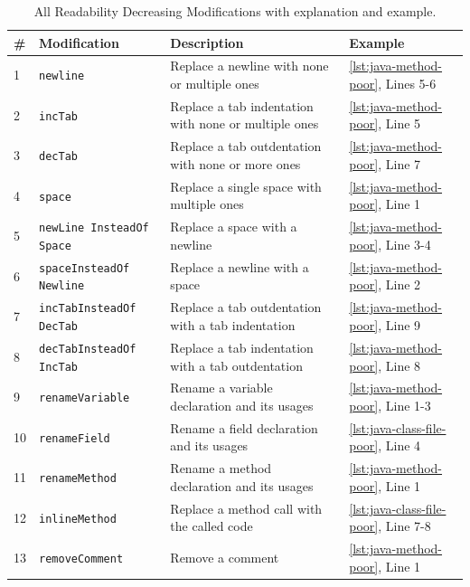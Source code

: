 \documentclass[%
class=scrreprt,
chapterprefix=false,%
open=right,%
twoside=true,%
paper=a4,%
logofile={Logo\_zentral\_farbig\_EN.png},%
thesistype=master,%
UKenglish,%
]{se2thesis}
\theoremstyle{definition}
\newcommand{\RDMs}{Readability Decreasing Modifications\xspace}
\begin{document}
		\begin{table}[p]
		\centering
		\caption{All \RDMs with explanation and example.}
		\label{tab:rdh-description}
		\begin{tabular}{|p{}|p{}|p{}|p{}|}
			\hline
			\textbf{\#} & \textbf{Modification} & \textbf{Description} & \textbf{Example} \\
			\hline
			1 & \texttt{newline} & Replace a newline with none or multiple ones & \autoref{lst:java-method-poor}, Lines 5-6 \\
			\hline
			2 & \texttt{incTab} & Replace a tab indentation with none or multiple ones & \autoref{lst:java-method-poor}, Line 5 \\
			\hline
			3 & \texttt{decTab} & Replace a tab outdentation with none or more ones & \autoref{lst:java-method-poor}, Line 7 \\
			\hline
			4 & \texttt{space} & Replace a single space with multiple ones & \autoref{lst:java-method-poor}, Line 1 \\
			\hline
			5 & \texttt{newLine InsteadOf Space} & Replace a space with a newline & \autoref{lst:java-method-poor}, Line 3-4 \\
			\hline
			6 & \texttt{spaceInsteadOf Newline} & Replace a newline with a space & \autoref{lst:java-method-poor}, Line 2 \\
			\hline
			7 & \texttt{incTabInsteadOf DecTab} & Replace a tab outdentation with a tab indentation & \autoref{lst:java-method-poor}, Line 9 \\
			\hline
			8 & \texttt{decTabInsteadOf IncTab} & Replace a tab indentation with a tab outdentation & \autoref{lst:java-method-poor}, Line 8 \\
			\hline
			9 & \texttt{renameVariable} & Rename a variable declaration and its usages & \autoref{lst:java-method-poor}, Line 1-3 \\
			\hline
			10 & \texttt{renameField} & Rename a field declaration and its usages & \autoref{lst:java-class-file-poor}, Line 4 \\
			\hline
			11 & \texttt{renameMethod} & Rename a method declaration and its usages & \autoref{lst:java-method-poor}, Line 1 \\
			\hline
			12 & \texttt{inlineMethod} & Replace a method call with the called code & \autoref{lst:java-class-file-poor}, Line 7-8 \\
			\hline
			13 & \texttt{removeComment} & Remove a comment & \autoref{lst:java-method-poor}, Line 1 \\

\end{tabular}
\end{table}
\end{document}
